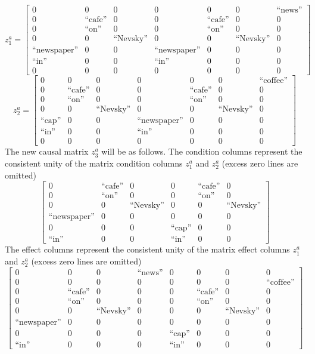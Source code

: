 \documentclass[review]{elsarticle}
\begin{document}
\[
z_1^a= \left[\begin{array}{ccc|cccc}
0&0&0&0&0&0&\text{``news''}\\
0&\text{``cafe''}&0&0&\text{``cafe''}&0&0\\
0&\text{``on''}&0&0 &\text{``on''}&0&0\\
0& 0& \text{``Nevsky''}&0 &0&\text{``Nevsky''}&0\\
\text{``newspaper''}&0&0&\text{``newspaper''}&0&0&0\\
\text{``in''} &0 &0 &\text{``in''}&0&0&0\\
0&0 &0 & 0 &0&0&0
\end{array}
\right]
\]
\[
z_2^a= \left[\begin{array}{ccc|cccc}
0&0&0&0&0&0&\text{``coffee''}\\
0&\text{``cafe''}&0&0&\text{``cafe''}&0&0\\
0&\text{``on''}&0&0 &\text{``on''}&0&0\\
0& 0& \text{``Nevsky''}&0 &0&\text{``Nevsky''}&0\\
\text{``cap''}&0&0&\text{``newspaper''}&0&0&0\\
\text{``in''} &0 &0 &\text{``in''}&0&0&0\\
0&0 &0 & 0 &0&0&0
\end{array}
\right]
\] 
The new causal matrix $z_3^a$ will be as follows. The condition columns represent the consistent unity of the matrix condition columns $z_1^a$ and $z_2^a$ (excess zero lines are omitted)
\[
\left[\begin{array}{cccccc}
0&\text{``cafe''}&0&0&\text{``cafe''}&0\\
0&\text{``on''}&0&0 &\text{``on''}&0\\
0& 0& \text{``Nevsky''}&0 &0&\text{``Nevsky''}\\
\text{``newspaper''}&0&0&0&0&0\\
0&0&0&\text{``cap''}&0&0\\
\text{``in''} &0 &0 &\text{``in''}&0&0
\end{array}
\right]
\]
The effect columns represent the consistent unity of the matrix effect columns $z_1^a$ and $z_2^a$ (excess zero lines are omitted)
\[
\left[\begin{array}{cccccccc}
0&0 &0 &\text{``news''}&0&0&0&0\\
0&0 &0 &0&0&0&0&\text{``coffee''}\\	
0&\text{``cafe''}&0&0&0&\text{``cafe''}&0&0\\
0&\text{``on''}&0&0&0 &\text{``on''}&0&0\\
0& 0& \text{``Nevsky''}&0&0 &0&\text{``Nevsky''}&0\\
\text{``newspaper''}&0&0&0&0&0&0&0\\
0&0&0&0&\text{``cap''}&0&0&0\\
\text{``in''} &0 &0&0&\text{``in''}&0&0&0
\end{array}
\right]
\]
\end{document}
